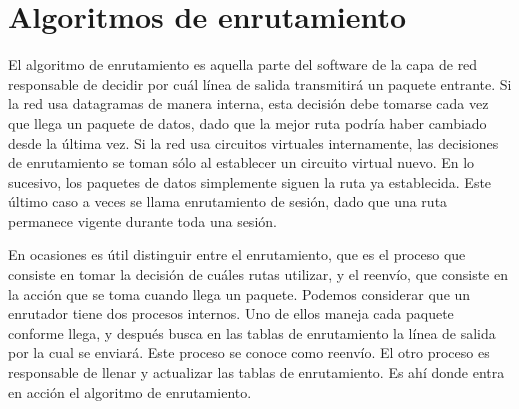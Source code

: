 \documentclass[10pt,a4paper]{report}
\begin{document}
\section{Algoritmos de enrutamiento}
	\par El algoritmo de enrutamiento es aquella parte del software de la capa de red 
	responsable de decidir por cuál línea de salida transmitirá un paquete entrante. Si la 
	red usa datagramas de manera interna, esta decisión debe tomarse cada vez que 
	llega un paquete de datos, dado que la mejor ruta podría haber cambiado desde la 
	última vez. Si la red usa circuitos virtuales internamente, las decisiones de 
	enrutamiento se toman sólo al establecer un circuito virtual nuevo. En lo sucesivo, 
	los paquetes de datos simplemente siguen la ruta ya establecida. Este último caso a 
	veces se llama enrutamiento de sesión, dado que una ruta permanece vigente 
	durante toda una sesión.
	\par En ocasiones es útil distinguir entre el enrutamiento, que es el proceso que 
	consiste en tomar la decisión de cuáles rutas utilizar, y el reenvío, que consiste en la 
	acción que se toma cuando llega un paquete. Podemos considerar que un enrutador 
	tiene dos procesos internos. Uno de ellos maneja cada paquete conforme llega, y 
	después busca en las tablas de enrutamiento la línea de salida por la cual se enviará. 
	Este proceso se conoce como reenvío. El otro proceso es responsable de llenar y 
	actualizar las tablas de enrutamiento. Es ahí donde entra en acción el algoritmo de 
	enrutamiento.
	
\end{document}
